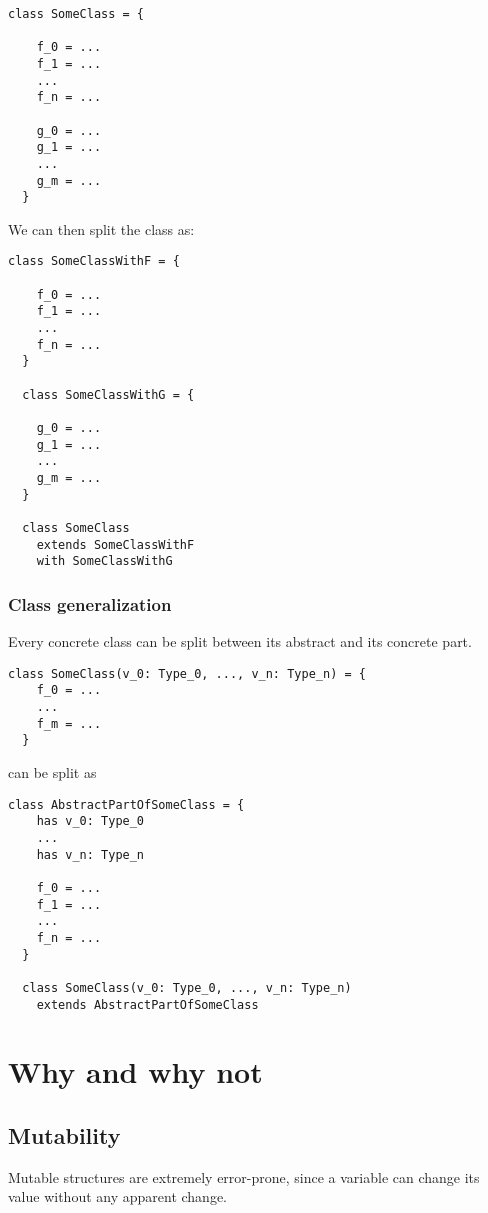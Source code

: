 \begin{lstlisting}[label={lst:rewritingClassSplitBefore}]
  class SomeClass = {

    f_0 = ...
    f_1 = ...
    ...
    f_n = ...

    g_0 = ...
    g_1 = ...
    ...
    g_m = ...
  }
\end{lstlisting}

We can then split the class as:

\begin{lstlisting}[label={lst:rewritingClassSplitAfter}]
  class SomeClassWithF = {

    f_0 = ...
    f_1 = ...
    ...
    f_n = ...
  }

  class SomeClassWithG = {

    g_0 = ...
    g_1 = ...
    ...
    g_m = ...
  }

  class SomeClass
    extends SomeClassWithF
    with SomeClassWithG
\end{lstlisting}

\subsubsection{Class generalization}

Every concrete class can be split between its abstract and its concrete part.

\begin{lstlisting}[label={lst:rewritingClassGeneralizationBefore}]
  class SomeClass(v_0: Type_0, ..., v_n: Type_n) = {
    f_0 = ...
    ...
    f_m = ...
  }
\end{lstlisting}

can be split as

\begin{lstlisting}[label={lst:rewritingClassGeneralizationAfter}]
  class AbstractPartOfSomeClass = {
    has v_0: Type_0
    ...
    has v_n: Type_n

    f_0 = ...
    f_1 = ...
    ...
    f_n = ...
  }

  class SomeClass(v_0: Type_0, ..., v_n: Type_n)
    extends AbstractPartOfSomeClass
\end{lstlisting}


\section{Why and why not}

\subsection{Mutability}
Mutable structures are extremely error-prone, since a variable can change its value without any apparent change.


